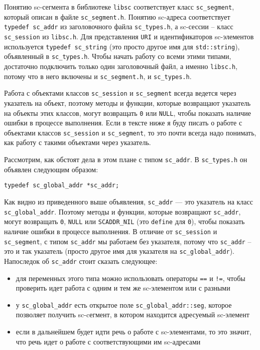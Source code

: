 Понятию sc-сегмента в библиотеке \texttt{libsc} соответствует класс
\lstinline{sc_segment}, который описан в файле
\verb|sc_segment.h|. Понятию sc-адреса соответствует
\lstinline{typedef sc_addr} из заголовочного файла \verb|sc_types.h|,
а sc-сессии – класс \lstinline{sc_session} из \verb|libsc.h|. Для
представления \texttt{URI} и идентификаторов sc-элементов используется
\lstinline{typedef sc_string} (это просто другое имя для
\lstinline{std::string}), объявленный в \verb|sc_types.h|. Чтобы
начать работу со всеми этими типами, достаточно подключить только один
заголовочный файл, а именно \verb|libsc.h|, потому что в него включены
и \verb|sc_segment.h|, и \verb|sc_types.h|.

Работа с объектами классов \lstinline{sc_session} и
\lstinline{sc_segment} всегда ведется через указатель на объект,
поэтому методы и функции, которые возвращают указатель на объекты этих
классов, могут возвращать \lstinline{0} или \lstinline{NULL}, чтобы
показать наличие ошибки в процессе выполнения. Если в тексте ниже я
буду писать о работе с объектами классов \lstinline{sc_session} и
\lstinline{sc_segment}, то это почти всегда надо понимать, как работу
с такими объектами через указатель.

Рассмотрим, как обстоят дела в этом плане с типом
\lstinline{sc_addr}. В \verb|sc_types.h| он объявлен следующим
образом:

\begin{lstlisting}
typedef sc_global_addr *sc_addr;
\end{lstlisting}

Как видно из приведенного выше объявления, \lstinline{sc_addr} --- это
указатель на класс \lstinline{sc_global_addr}. Поэтому методы и
функции, которые возвращают \lstinline{sc_addr}, могут возвращать
\lstinline{0}, \lstinline{NULL} или \lstinline{SCADDR_NIL} (это
\lstinline{define} для \lstinline{0}), чтобы показать наличие ошибки в
процессе выполнения. В отличие от \lstinline{sc_session} и
\lstinline{sc_segment}, с типом \lstinline{sc_addr} мы работаем без
указателя, потому что \lstinline{sc_addr} – это и так указатель
(просто другое имя для указателя на
\lstinline{sc_global_addr}). Напоследок об \lstinline{sc_addr} стоит
сказать следующее:

\begin{itemize}
\item для переменных этого типа можно использовать операторы
  \lstinline{==} и \lstinline{!=}, чтобы проверить идет работа с одним
  и тем же sc-элементом или с разными
\item у \lstinline{sc_global_addr} есть открытое поле
  \lstinline{sc_global_addr::seg}, которое позволяет получить
  sc-cегмент, в котором находится адресуемый sc-элемент
\item если в дальнейшем будет идти речь о работе с sc-элементами, то
  это значит, что речь идет о работе с соответствующими им
  sc-адресами
\end{itemize}

